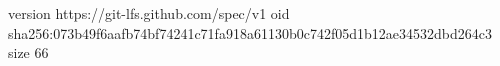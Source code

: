 version https://git-lfs.github.com/spec/v1
oid sha256:073b49f6aafb74bf74241c71fa918a61130b0c742f05d1b12ae34532dbd264c3
size 66
